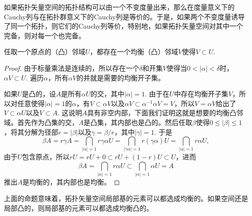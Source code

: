 如果拓扑矢量空间的拓扑结构可以由一个不变度量出来，那么在度量意义下的Cauchy列与在拓扑群意义下的Cauchy列是等价的。于是，如果两个不变度量诱导了同一个拓扑，则它们的Cauchy列等价，特别地，如果拓扑矢量空间对其中一个完备，则对每一个也完备。

\begin{pro}\label{1.30}
任取一个原点的（凸）邻域$U$，都存在一个均衡（凸）邻域$V$使得$V\subset U$. 
\end{pro}

\begin{proof}
	由于标量乘法是连续的，所以存在一个$\delta$和开集$V$使得当$0<|\alpha|<\delta$时，$\alpha V\subset U$. 遍历$\alpha$，所有$\alpha V$的并就是需要的均衡开子集。

	如果$U$是凸的，设$A$是所有$\alpha U$的交，其中$|\alpha|=1$. 由于在$U$中存在均衡开子集$V$，所以对任意使得$|\alpha|=1$的$\alpha$，有$V\subset \alpha V$以及$\alpha V\subset \alpha^{-1}\alpha V=V$，所以$V=\alpha V$给出了$V\subset \alpha U$以及$V\subset A$. 这说明$A$具有非空内部，下面我们证明这就是想要的均衡凸邻域。首先作为凸集的交，$A$是凸集，其内部也是凸的。然后任取$\beta$使得$0\leq |\beta|\leq 1$，将其分解为径部$r=|\beta|$以及$\gamma=\beta/r$，其中$|\gamma|=1$. 于是
	\[
	\beta A=r\gamma A=\bigcap_{|\alpha|=1}r\gamma\alpha U=\bigcap_{|\gamma\alpha|=1}r(\gamma\alpha) U=\bigcap_{|\alpha|=1}r\alpha U,
	\]
	由于$U$包含原点，所以$rU=rU+0\subset rU+(1-r)U\subset U$，进而
	\[
	\beta A=\bigcap_{|\alpha|=1}r\alpha U\subset \bigcap_{|\alpha|=1}\alpha U=A
	\]
	推出$A$是均衡的，其内部也是均衡。
\end{proof}

上面的命题意味着，拓扑矢量空间局部基的元素可以都选成均衡的。如果空间还是局部凸的，则局部基的元素可以都选成均衡凸的。

